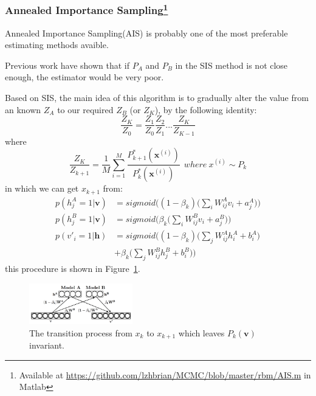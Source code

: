 
\subsubsection{Annealed Importance Sampling\protect\footnote{Available at \protect\url{https://github.com/lzhbrian/MCMC/blob/master/rbm/AIS.m} in Matlab}}
Annealed Importance Sampling(AIS)\cite{neal2001annealed,salakhutdinov2009learning} is probably one of the most preferable estimating methods avaible.

Previous work \cite{mackay2003information} have shown that if $P_{A}$ and $P_{B}$ in the SIS method is not close enough, the estimator would be very poor.

Based on SIS, the main idea of this algorithm is to gradually alter the value from an known $Z_{A}$ to our required $Z_{B}$ (or $Z_{K}$), by the following identity:
\begin{equation}
\frac{Z_{K}}{Z_{0}} = \frac{Z_{1}}{Z_{0}} \frac{Z_{2}}{Z_{1}} ... \frac{Z_{K}}{Z_{K-1}}
\end{equation}
where 
\begin{equation}
\frac{Z_{K}}{Z_{k+1}} = \frac{1}{M} \sum_{i=1}^{M} \frac{P_{k+1}^{*}(\mathbf x^{(i)})}{P_{k}^{*}(\mathbf x^{(i)})}
~~where~ x^{(i)} \sim P_{k}
\end{equation}
in which we can get $x_{k+1}$ from:
\begin{equation}
\begin{aligned}
p(h^{A}_{j}=1|\mathbf v) &= sigmoid\Bigg( (1-\beta_{k})\Bigg(\sum_{i}W^{A}_{ij}v_{i}+a^{A}_{j}\Bigg) \Bigg) \\
p(h^{B}_{j}=1|\mathbf v) &= sigmoid\Bigg( \beta_{k}\Bigg(\sum_{i}W^{B}_{ij}v_{i}+a^{B}_{j}\Bigg) \Bigg) \\ 
p(v'_{i}=1|\mathbf h) &= sigmoid\Bigg( (1-\beta_{k})\Bigg(\sum_{j}W^{A}_{ij}h_{i}^{A}+b^{A}_{i}\Bigg) \\
& + \beta_{k}\Bigg(\sum_{j}W^{B}_{ij}h_{j}^{B}+b^{B}_{i}\Bigg) \Bigg) 
\end{aligned}
\end{equation}
this procedure is shown in Figure~\ref{fig:xkxk1}.

\begin{figure}[tb]
  	\centering
  	\includegraphics[width=0.4\textwidth]{figure/xkxk1.png}
	\caption{The transition process from $x_{k}$ to $x_{k+1}$ which leaves $P_{k}(\mathbf v)$ invariant.}
	\label{fig:xkxk1}
\end{figure}

